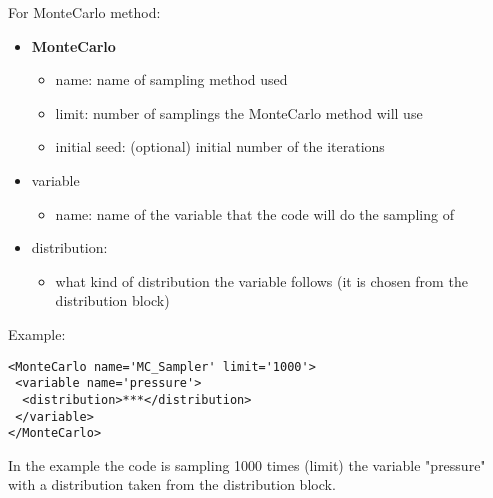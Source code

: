 For MonteCarlo method: 
\begin{itemize}
\item \textbf{MonteCarlo}
\begin{itemize}
\item name: name of sampling method used
\item limit: number of samplings the MonteCarlo method will use
\item initial seed: (optional) initial number of the iterations
\end{itemize}
\item variable 
\begin{itemize}
\item name: name of the variable that the code will do the sampling of
\end{itemize}
\item distribution: 
\begin{itemize}
\item what kind of distribution the variable follows (it is chosen from the distribution block)
\end{itemize}
\end{itemize}

Example:

\begin{lstlisting}[style=XML]
<MonteCarlo name='MC_Sampler' limit='1000'> 
 <variable name='pressure'> 
  <distribution>***</distribution> 	
 </variable> 
</MonteCarlo> 
\end{lstlisting}
In the example the code is sampling 1000 times (limit) the variable "pressure" with a distribution taken from the distribution block.

